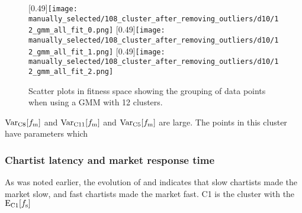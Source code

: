 \begin{figure}
	\centering
	\subcaptionbox{}[0.49\linewidth]{\texttt{[image: manually\_selected/108\_cluster\_after\_removing\_outliers/d10/12\_gmm\_all\_fit\_0.png]}}
	\subcaptionbox{}[0.49\linewidth]{\texttt{[image: manually\_selected/108\_cluster\_after\_removing\_outliers/d10/12\_gmm\_all\_fit\_1.png]}}
	\subcaptionbox{}[0.49\linewidth]{\texttt{[image: manually\_selected/108\_cluster\_after\_removing\_outliers/d10/12\_gmm\_all\_fit\_2.png]}}
	\caption{Scatter plots in fitness space showing the grouping of data points when using a GMM with 12 clusters.}
	\label{fig:d10_scatter_clusters}
\end{figure}


$\mathrm{Var}_\text{C8}[f_\text{m}]$ and $\mathrm{Var}_\text{C11}[f_\text{m}]$ and $\mathrm{Var}_\text{C5}[f_\text{m}]$ are large. The points in this cluster have parameters which 



\subsubsection*{Chartist latency and market response time}
As was noted earlier, the evolution of \sclatencymu and \timetoreachnewfundamental indicates that slow chartists made the market slow, and fast chartists made the market fast. C1 is the cluster with the $\mathrm{E}_\text{C{1}}[f_\text{s}]$

